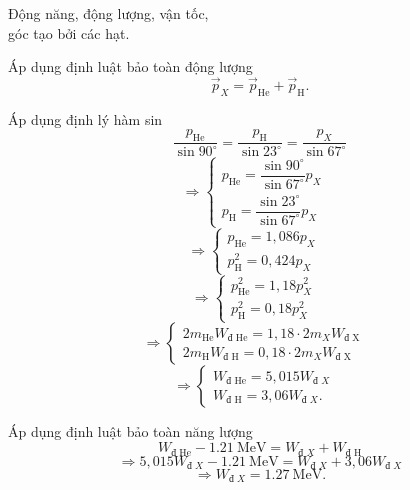 \begin{dang}{Động năng, động lượng, vận tốc,\\ góc tạo bởi các hạt.}
{		 Áp dụng định luật bảo toàn động lượng
		 \begin{equation*}
		 \vec{p}_X=\vec{p}_\text{He}+\vec{p}_\text{H}.
		 \end{equation*}
		 
		 Áp dụng định lý hàm sin
		 \begin{equation*}
		 \dfrac{p_\text{He}}{\sin 90^\circ}=\dfrac{p_\text{H}}{\sin 23^\circ}=\dfrac{p_X}{\sin 67^\circ}
		 \end{equation*}
		 \begin{equation*}
		 \Rightarrow
		 \left\{\begin{array}{ll}{p_\text{He}=\dfrac{\sin 90^\circ}{\sin 67^\circ}{p_X}}&\\
		 {p_\text{H}=\dfrac{\sin 23^\circ}{\sin 67^\circ}{p_X}}&\end{array}\right.
		 \end{equation*}
		 \begin{equation*}
		 \Rightarrow\left\{\begin{array}{ll}{p_\text{He}=1,086p_X}&\\{p_\text{H}^{2}=0,424p_X}&\end{array}\right.
		 \end{equation*}
		 \begin{equation*}
		 \Rightarrow\left\{\begin{array}{ll}{p_\text{He}^{2}=1,18p_X^2}&\\{p_\text{H}^{2}=0,18p_X^2}&\end{array}\right.
		 \end{equation*}
	 	\begin{equation*}
	 	\Rightarrow \left\{\begin{array}{ll}{2{m_\text{He}}{W_\textrm{đ He}}=1,18\cdot2{m_X}{W_\textrm{đ X}}}&\\
	 	{2{m_\text{H}}{W_\textrm{đ H}}=0,18\cdot2{m_X}{W_\textrm{đ X}}}&\end{array}\right.
	 	\end{equation*}
		\begin{equation*}
		 \Rightarrow \left\{\begin{array}{ll}{{W_\textrm{đ He}}=5,015W_{\textrm{đ }X}}&\\
		 {{W_\textrm{đ H}}=3,06W_{\textrm{đ }X}}.&\end{array}\right.
		 \end{equation*}
		 
		 
		 Áp dụng định luật bảo toàn năng lượng
		 \begin{equation*}
		 W_\textrm{đ He} - \SI{1,21}{\mega\electronvolt}= W_{\textrm{đ }X} + W_\textrm{đ H}
		 \end{equation*}
		 \begin{equation*}
		 \Rightarrow 5,015W_{\textrm{đ }X} - \SI{1,21}{\mega\electronvolt} = W_{\textrm{đ }X} + 3,06W_{\textrm{đ }X}
		\end{equation*}
		\begin{equation*}
		\Rightarrow W_{\textrm{đ }X}=\SI{1,27}{\mega\electronvolt}.
		\end{equation*}

}
\end{dang}
